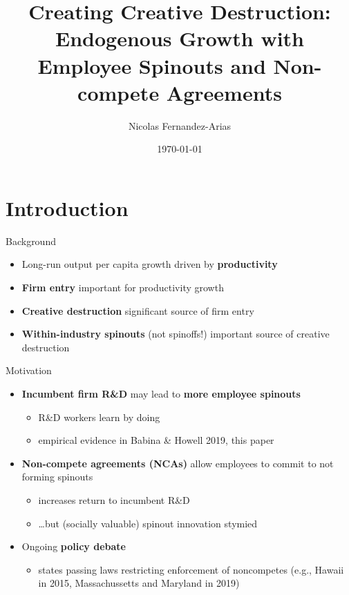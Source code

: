 \documentclass[english,usenames,dvipsnames,handout]{beamer}
\title{Creating Creative Destruction: Endogenous Growth with Employee Spinouts and Non-compete Agreements}
\author{Nicolas Fernandez-Arias}
\date{\today }
\begin{document}
\maketitle

\section{Introduction}

\begin{frame}{Background}\label{motivation_spillovers}
\begin{itemize}
	\item<+-> Long-run output per capita growth driven by \alert{\textbf{productivity}} \hyperlink{economic_growth_facts}{}
	\smallskip
	\item<+-> \alert{\textbf{Firm entry}} important for productivity growth \hyperlink{motivation:importance_of_firm_entry}{}
	\smallskip
	\item<+-> \alert{\textbf{Creative destruction}} significant source of firm entry \hyperlink{motivation:importance_of_creative_destruction}{}
	\item<+-> \alert{\textbf{Within-industry spinouts}} (not spinoffs!) important source of creative destruction  \hyperlink{spinouts_facts_from_literature}{} 	\hyperlink{fairchildren_early}{}
\end{itemize}
\end{frame}

\begin{frame}{Motivation}\label{motivation}
\begin{itemize}
	\item<+-> \alert{\textbf{Incumbent firm R\&D}} may lead to \alert{\textbf{more employee spinouts}}
	\begin{itemize}
		\item R\&D workers learn by doing 
		\item empirical evidence in Babina \& Howell 2019, this paper
	\end{itemize}
	\smallskip
	\item<+-> \alert{\textbf{Non-compete agreements (NCAs)}} allow employees to commit to not forming spinouts
	\begin{itemize}
		\item<+-> increases return to incumbent R\&D
		\item<+-> \ldots but (socially valuable) spinout innovation stymied
	\end{itemize}
	\smallskip
	\item<+-> Ongoing \alert{\textbf{policy debate}}
	\begin{itemize}
		\item states passing laws restricting enforcement of noncompetes (e.g., Hawaii in 2015, Massachussetts and Maryland in 2019) 
	\end{itemize}
\end{itemize}
\end{frame}
\end{document}
